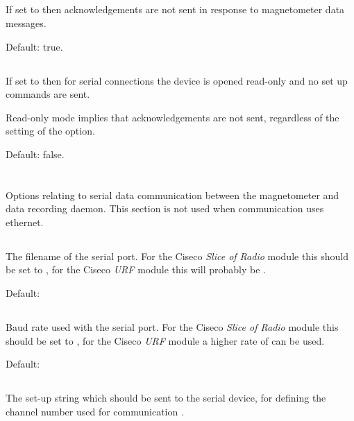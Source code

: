 \subsection{}
If set to  then acknowledgements are not sent in response
to magnetometer data messages.

Default: true.

\subsection{}
If set to  then for serial connections the device is opened
read-only and no set up commands are sent.

Read-only mode implies that acknowledgements are not sent, regardless
of the setting of the  option.

Default: false.

\section{\code{[serial]}}
Options relating to serial data communication between the magnetometer
and data recording daemon. This section is not used when communication
uses ethernet.

\subsection{}
The filename of the serial port. For the Ciseco \emph{Slice of Radio} module
this should be set to , for the Ciseco
\emph{URF} module this will probably be .

Default: 

\subsection{}
Baud rate used with the serial port. For the Ciseco \emph{Slice of
  Radio} module this should be set to , for the Ciseco
\emph{URF} module a higher rate of  can be used.

Default: 

\subsection{}
The set-up string which should be sent to the serial device, for
defining the channel number used for communication \etc.

